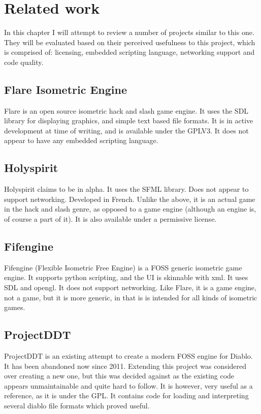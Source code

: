 \chapter{Related work}
In this chapter I will attempt to review a number of projects similar to this one. They will be evaluated based on their perceived usefulness to this project, which is comprised of: licensing, embedded scripting language, networking support and code quality.

    	\section{Flare Isometric Engine}
    	Flare\cite{flare} is an open source isometric hack and slash game engine. It uses the SDL library for displaying graphics, and simple text based file formats. It is in active development at time of writing, and is available under the GPLV3.
    	It does not appear to have any embedded scripting language.
    	
    	\section{Holyspirit}
    	Holyspirit\cite{holyspirit} claims to be in alpha. It uses the SFML library. Does not appear to support networking.
    	Developed in French. Unlike the above, it is an actual game in the hack and slash genre, as opposed to a game engine (although an engine is, of course a part of it). It is also available under a permissive license.
    	
    	\section{Fifengine}
    	Fifengine\cite{fife} (Flexible Isometric Free Engine) is a FOSS generic isometric game engine.
    	It supports python scripting, and the UI is skinnable with xml.
    	It uses SDL and opengl. It does not support networking.
    	Like Flare, it is a game engine, not a game, but it is more generic, in that is is intended for all kinds of isometric games.
    	
    	\section{ProjectDDT}
    	ProjectDDT\cite{ddt} is an existing attempt to create a modern FOSS engine for Diablo.
    	It has been abandoned now since 2011.
    	Extending this project was considered over creating a new one, but this was decided against as the existing code appears unmaintainable and quite hard to follow.
    	It is however, very useful as a reference, as it is under the GPL.
    	It contains code for loading and interpreting several diablo file formats which proved useful.
    	
